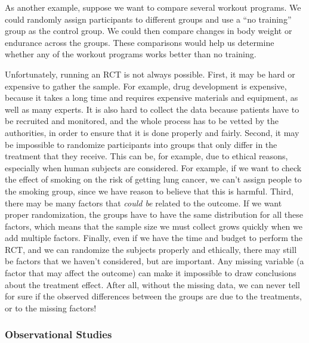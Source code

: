 As another example, suppose we want to compare several workout programs. We
could randomly assign participants to different groups and use a ``no
training'' group as the control group. We could then compare changes in body
weight or endurance across the groups. These comparisons would help us
determine whether any of the workout programs works better than no
training.



Unfortunately, running an RCT is not always possible. First, it may be hard or expensive
to gather the sample. For example, drug development is expensive, because
it takes a long time and requires expensive materials and equipment,
as well as many experts. It is also hard to collect the data because patients have
to be recruited and monitored, and the whole process has to be vetted by the
authorities, in order to ensure that it is done properly and fairly. 
Second, it may be impossible to randomize participants into groups
that only differ in the treatment that they receive. This can be, for example, due to
ethical reasons, especially when human subjects are considered.
For example, if we want to check the effect of smoking on the risk of getting lung
cancer,
we can't assign people to the smoking group, since we have reason to believe that
this is harmful.
Third, there may be many factors that \emph{could be} related to the outcome. If we want
proper randomization, the groups have to have the same distribution for all these
factors, which means that the sample size we must collect grows quickly when we
add multiple factors. Finally, even if we have the time and budget to perform the RCT, 
and we can randomize the subjects properly and ethically, there may still be factors
that we haven't considered, but are important. Any missing variable (a factor that
may affect the outcome) can make it impossible to draw conclusions about the
treatment effect. After all, without the missing data, we can never tell for sure if
the observed differences between the groups are due to the treatments, or to the
missing factors!

\subsubsection{Observational Studies}

